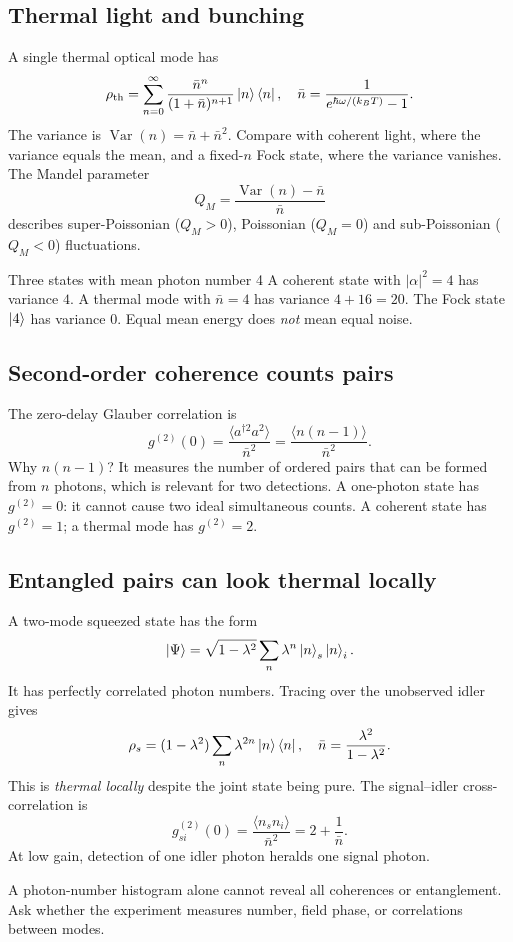 \subsection{Thermal light and bunching}
A single thermal optical mode has
\[
\rho_{\rm th}=\sum_{n=0}^\infty
\frac{\bar n^n}{(1+\bar n)^{n+1}}\left\lvert n\right\rangle\left\langle n\right\rvert,
\quad
\bar n=\frac{1}{e^{\hbar\omega/(k_BT)}-1}.
\]
The variance is
\(\operatorname{Var}(n)=\bar n+\bar n^2\).
Compare with coherent light, where the variance
equals the mean, and a fixed-\(n\) Fock state,
where the variance vanishes.
The Mandel parameter
\[
Q_M=\frac{\operatorname{Var}(n)-\bar n}{\bar n}
\]
describes super-Poissonian (\(Q_M>0\)),
Poissonian (\(Q_M=0\)) and sub-Poissonian
(\(Q_M<0\)) fluctuations.

\begin{worked}{Three states with mean photon number 4}
A coherent state with \(|\alpha|^2=4\)
has variance \(4\). A thermal mode with
\(\bar n=4\) has variance \(4+16=20\).
The Fock state \(\left\lvert 4\right\rangle\) has variance \(0\).
Equal mean energy does \emph{not} mean equal noise.
\end{worked}

\subsection{Second-order coherence counts pairs}
The zero-delay Glauber correlation is
\[
\boxed{g^{(2)}(0)=
\frac{\langle a^{\dagger2}a^2\rangle}{\bar n^2}
=\frac{\langle n(n-1)\rangle}{\bar n^2}}.
\]
Why \(n(n-1)\)? It measures the number of
ordered pairs that can be formed from \(n\)
photons, which is relevant for two detections.
A one-photon state has \(g^{(2)}=0\):
it cannot cause two ideal simultaneous counts.
A coherent state has \(g^{(2)}=1\);
a thermal mode has \(g^{(2)}=2\).

\subsection{Entangled pairs can look thermal locally}
A two-mode squeezed state has the form
\[
\left\lvert \Psi\right\rangle=\sqrt{1-\lambda^2}
\sum_n\lambda^n\left\lvert n\right\rangle_s\left\lvert n\right\rangle_i.
\]
It has perfectly correlated photon numbers.
Tracing over the unobserved idler gives
\[
\rho_s=(1-\lambda^2)\sum_n\lambda^{2n}\left\lvert n\right\rangle\left\langle n\right\rvert,
\quad \bar n=\frac{\lambda^2}{1-\lambda^2}.
\]
This is \emph{thermal locally} despite the joint state
being pure. The signal--idler cross-correlation is
\[
g_{si}^{(2)}(0)=
\frac{\langle n_sn_i\rangle}{\bar n^2}
=2+\frac1{\bar n}.
\]
At low gain, detection of one idler photon
heralds one signal photon.

\begin{checkpoint}
A photon-number histogram alone cannot reveal
all coherences or entanglement. Ask whether
the experiment measures number, field phase,
or correlations between modes.
\end{checkpoint}
